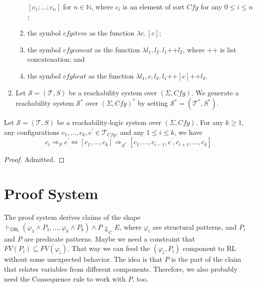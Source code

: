 \documentclass{article}
\newcommand{\CRL}{\mathsf{CRL}}
\newcommand{\Tcfg}{\mathcal{T}_{\mathit{Cfg}}}
\begin{document}
\begin{definition}
\begin{enumerate}
\begin{enumerate}
              $[c_1;\ldots;c_n]$ for $n \in \mathbb{N}$, where $c_i$ is an element of sort $\mathit{Cfg}$
              for any $0 \leq i \leq n$;
              \item the symbol $\mathit{cfgitem}$ as the function $\lambda c.\, [c]$;
              \item the symbol $\mathit{cfgconcat}$ as the function $\lambda l_1,l_2.\, l_1 \texttt{++} l_2$,
                where $\texttt{++}$ is list concatenation; and
              \item the symbol $\mathit{cfgheat}$ as the function
                $\lambda l_1, c, l_2.\, l_1 \texttt{++} [c] \texttt{++} l_2$.
          \end{enumerate}
          
    \item Let $\mathcal{S} = (\mathcal{T}, S)$ be a reachability system over $(\Sigma, \mathit{Cfg})$.
          We generate a reachability system $\mathcal{S}^*$ over $(\Sigma, \mathit{Cfg})^*$
          by setting $\mathcal{S}^* = (\mathcal{T}^*, S^*)$.
\end{enumerate}
\end{definition}

\begin{lemma}
    Let $\mathcal{S} = (\mathcal{T}, S)$ be a reachability-logic system over $(\Sigma, \mathit{Cfg})$.
    For any $k \geq 1$, any configurations $c_1,\ldots,c_k, c^\prime \in \Tcfg$, and any $1 \leq i \leq k$,
    we have
    \begin{equation*}
        c_i \Rightarrow_{\mathcal{S}} c^\prime
                    \iff
        [c_1,\ldots,c_k] \Rightarrow_{\mathcal{S}^*} [c_1, \ldots, c_{i-1}, c^\prime, c_{i+1}, \ldots, c_k]
    \end{equation*}
\end{lemma}
\begin{proof}
Admitted.
\end{proof}


\section{Proof System}

The proof system derives claims of the shape
$\vdash_\CRL (\varphi_1 \land P_1, \ldots, \varphi_k \land P_k) \land P \Downarrow_C E$,
where $\varphi_i$ are structural patterns, and $P_i$ and $P$ are predicate patterns.
Maybe we need a constraint that $\mathit{FV}(P_i) \subseteq \mathit{FV}(\varphi_i)$.
That way we can feed the $(\varphi_i, P_i)$ component to RL without some unexpected behavior.
The idea is that $P$ is the part of the claim that relates variables from different components.
Therefore, we also probably need the Consequence rule to work with $P$, too.
\end{document}
